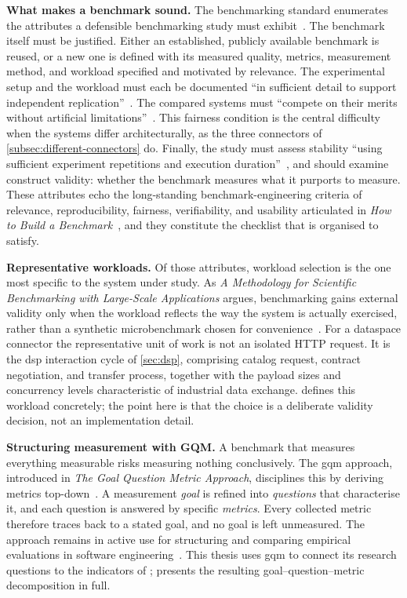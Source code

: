 \textbf{What makes a benchmark sound.} The benchmarking standard enumerates the attributes a defensible benchmarking study must exhibit~\citep{empiricalStandardsBenchmarking}. The benchmark itself must be justified. Either an established, publicly available benchmark is reused, or a new one is defined with its measured quality, metrics, measurement method, and workload specified and motivated by relevance. The experimental setup and the workload must each be documented ``in sufficient detail to support independent replication''~\citep{empiricalStandardsBenchmarking}. The compared systems must ``compete on their merits without artificial limitations''~\citep{empiricalStandardsBenchmarking}. This fairness condition is the central difficulty when the systems differ architecturally, as the three connectors of \cref{subsec:different-connectors} do. Finally, the study must assess stability ``using sufficient experiment repetitions and execution duration''~\citep{empiricalStandardsBenchmarking}, and should examine construct validity: whether the benchmark measures what it purports to measure. These attributes echo the long-standing benchmark-engineering criteria of relevance, reproducibility, fairness, verifiability, and usability articulated in \emph{How to Build a Benchmark}~\citep{kistowski2015benchmark}, and they constitute the checklist that  is organised to satisfy.

\textbf{Representative workloads.} Of those attributes, workload selection is the one most specific to the system under study. As \emph{A Methodology for Scientific Benchmarking with Large-Scale Applications} argues, benchmarking gains external validity only when the workload reflects the way the system is actually exercised, rather than a synthetic microbenchmark chosen for convenience~\citep{armstrong2001large}. For a dataspace connector the representative unit of work is not an isolated HTTP request. It is the \gls{dsp} interaction cycle of \cref{sec:dsp}, comprising catalog request, contract negotiation, and transfer process, together with the payload sizes and concurrency levels characteristic of industrial data exchange.  defines this workload concretely; the point here is that the choice is a deliberate validity decision, not an implementation detail.

\textbf{Structuring measurement with GQM.} A benchmark that measures everything measurable risks measuring nothing conclusively. The \gls{gqm} approach, introduced in \emph{The Goal Question Metric Approach}, disciplines this by deriving metrics top-down~\citep{caldiera1994goal}. A measurement \emph{goal} is refined into \emph{questions} that characterise it, and each question is answered by specific \emph{metrics}. Every collected metric therefore traces back to a stated goal, and no goal is left unmeasured. The approach remains in active use for structuring and comparing empirical evaluations in software engineering~\citep{minhas2023gqm}. This thesis uses \gls{gqm} to connect its research questions to the indicators of ;  presents the resulting goal--question--metric decomposition in full.

